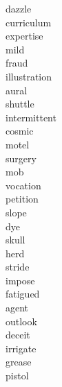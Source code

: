 \documentclass[a4paper, 11pt]{ctexart}
\begin{document}
\begin{multicols*}{3}
\begin{description}
\item[dazzle]

\item[curriculum]

\item[expertise]

\item[mild]

\item[fraud]

\item[illustration]

\item[aural]

\item[shuttle]

\item[intermittent]

\item[cosmic]

\item[motel]

\item[surgery]

\item[mob]

\item[vocation]

\item[petition]

\item[slope]

\item[dye]

\item[skull]

\item[herd]

\item[stride]

\item[impose]

\item[fatigued]

\item[agent]

\item[outlook]

\item[deceit]

\item[irrigate]

\item[grease]

\item[pistol]


\end{description}
\end{multicols*}
\end{document}
